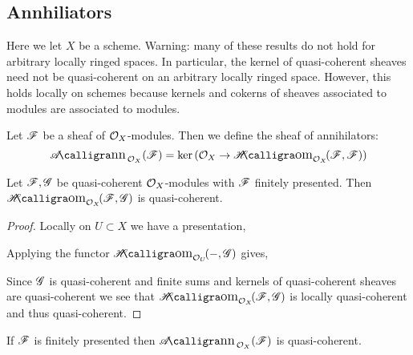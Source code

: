 \documentclass[12pt]{article}
\begin{document}
\subsection{Annhiliators}

\begin{rmk}
Here we let $X$ be a scheme. Warning: many of these results do not hold for arbitrary locally ringed spaces. In particular, the kernel of quasi-coherent sheaves need not be quasi-coherent on an arbitrary locally ringed space. However, this holds locally on schemes because kernels and cokerns of sheaves associated to modules are associated to modules.
\end{rmk}

\begin{defn}
Let $\mathscr{F}$ be a sheaf of $\mathcal{O}_{X}$-modules. Then we define the sheaf of annihilators: 
\[ \shAnn{\struct{X}}{\F} = \ker{(\struct{X} \to \shHom{\struct{X}}{\F}{\F})} \]
\end{defn}

\begin{lemma}
Let $\mathscr{F}, \mathscr{G}$ be quasi-coherent $\mathcal{O}_{X}$-modules with $\mathscr{F}$ finitely presented. Then $\shHom{\struct{X}}{\F}{\G}$ is quasi-coherent.
\end{lemma}

\begin{proof}
Locally on $U \subset X$ we have a presentation,
\begin{center}
\end{center}
Applying the functor $\shHom{\struct{U}}{-}{\G}$ gives,
\begin{center}
\end{center}
Since $\mathscr{G}$ is quasi-coherent and finite sums and kernels of quasi-coherent sheaves are quasi-coherent we see that $\shHom{\struct{X}}{\F}{\G}$ is locally quasi-coherent and thus quasi-coherent.
\end{proof}

\begin{lemma}
If $\mathscr{F}$ is finitely presented then $\shAnn{\struct{X}}{\F}$ is quasi-coherent.
\end{lemma}
\end{document}
